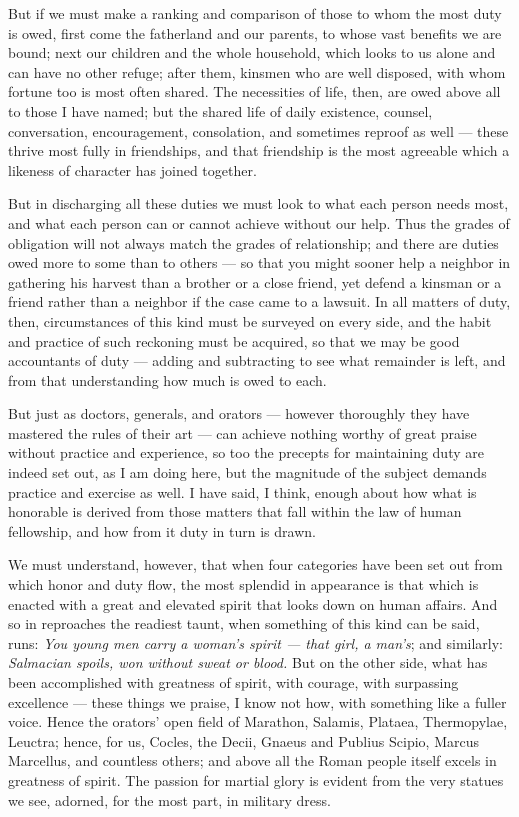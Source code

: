  But if we must make a ranking and comparison of those to whom the most duty is owed, first come the fatherland and our parents, to whose vast benefits we are bound; next our children and the whole household, which looks to us alone and can have no other refuge; after them, kinsmen who are well disposed, with whom fortune too is most often shared. The necessities of life, then, are owed above all to those I have named; but the shared life of daily existence, counsel, conversation, encouragement, consolation, and sometimes reproof as well — these thrive most fully in friendships, and that friendship is the most agreeable which a likeness of character has joined together.

 But in discharging all these duties we must look to what each person needs most, and what each person can or cannot achieve without our help. Thus the grades of obligation will not always match the grades of relationship; and there are duties owed more to some than to others — so that you might sooner help a neighbor in gathering his harvest than a brother or a close friend, yet defend a kinsman or a friend rather than a neighbor if the case came to a lawsuit. In all matters of duty, then, circumstances of this kind must be surveyed on every side, and the habit and practice of such reckoning must be acquired, so that we may be good accountants of duty — adding and subtracting to see what remainder is left, and from that understanding how much is owed to each.

 But just as doctors, generals, and orators — however thoroughly they have mastered the rules of their art — can achieve nothing worthy of great praise without practice and experience, so too the precepts for maintaining duty are indeed set out, as I am doing here, but the magnitude of the subject demands practice and exercise as well. I have said, I think, enough about how what is honorable is derived from those matters that fall within the law of human fellowship, and how from it duty in turn is drawn.

 We must understand, however, that when four categories have been set out from which honor and duty flow, the most splendid in appearance is that which is enacted with a great and elevated spirit that looks down on human affairs. And so in reproaches the readiest taunt, when something of this kind can be said, runs: \textit{You young men carry a woman's spirit — that girl, a man's}; and similarly: \textit{Salmacian spoils, won without sweat or blood.} But on the other side, what has been accomplished with greatness of spirit, with courage, with surpassing excellence — these things we praise, I know not how, with something like a fuller voice. Hence the orators' open field of Marathon, Salamis, Plataea, Thermopylae, Leuctra; hence, for us, Cocles, the Decii, Gnaeus and Publius Scipio, Marcus Marcellus, and countless others; and above all the Roman people itself excels in greatness of spirit. The passion for martial glory is evident from the very statues we see, adorned, for the most part, in military dress.

